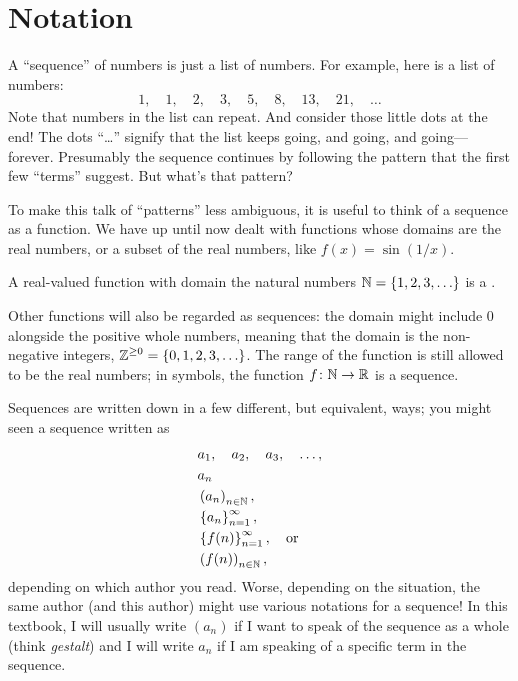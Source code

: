 
\section{Notation}
\label{section:notation}


\nobreak A ``sequence'' of numbers is just a list of numbers.  For
example, here is a list of numbers:
$$
1,\quad 1,\quad 2,\quad 3,\quad 5,\quad 8,\quad 13,\quad 21,\quad \ldots
$$
Note that numbers in the list can repeat.  And consider those little
dots at the end!  The dots ``\ldots'' signify that the list keeps
going, and going, and going---forever.  Presumably the sequence
continues by following the pattern that the first few ``terms''
suggest.  But what's that pattern?

To make this talk of ``patterns'' less ambiguous, it is useful to
think of a sequence as a function. We have up until now dealt with
functions whose domains are the real numbers, or a subset of the real
numbers, like $f(x)=\sin (1/x)$.

A real-valued function with domain the natural numbers
$\mathbb{N}=\{1,2,3,\ldots\}$ is a .

Other functions will also be regarded as sequences: the domain might
include $0$ alongside the positive whole numbers, meaning that the
domain is the non-negative integers, $\displaystyle
\mathbb{Z}^{\ge0}=\{0,1,2,3,\ldots\}$.  The range of the function is still
allowed to be the real numbers; in symbols, the function $f\colon
\mathbb{N}\to\mathbb{R}$ is a sequence.


Sequences are written down in a few different, but equivalent,
ways; you might seen a sequence written as
\begin{align*}
  & a_1,\quad a_2, \quad a_3, \quad\ldots, \\
  & a_n \\
  & \left(a_n\right)_{n \in \mathbb{N}}, \\
  & \left\{a_n\right\}_{n=1}^\infty, \\
  & \left\{f(n)\right\}_{n=1}^\infty, \quad \mbox{or} \\
  & \left(f(n)\right)_{n \in \mathbb{N}},
\end{align*}
depending on which author you read.  Worse, depending on the
situation, the same author (and this author) might use various
notations for a sequence!  In this textbook, I will usually write
$(a_n)$ if I want to speak of the sequence as a whole (think
\textit{gestalt}) and I will write $a_n$ if I am speaking of a
specific term in the sequence.

